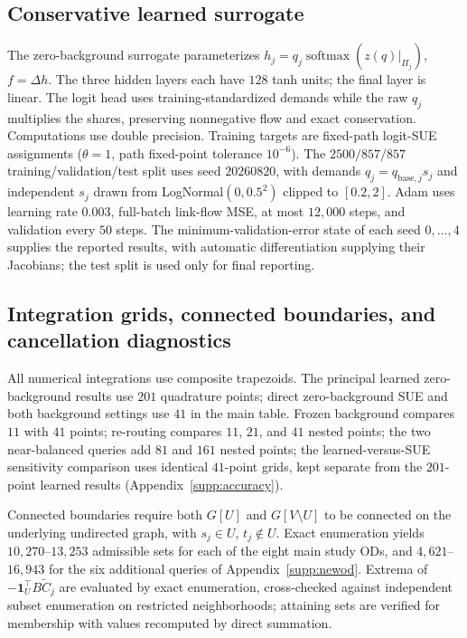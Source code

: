 \subsection{Conservative learned surrogate}\label{supp:protocol}
The zero-background surrogate parameterizes
$h_j=q_j\operatorname{softmax}(z(q)|_{\Pi_j})$, $f=\Delta h$.
The three hidden layers each have $128$ tanh units; the final layer is
linear. The logit head uses training-standardized demands while the raw
$q_j$ multiplies the shares, preserving nonnegative flow and exact
conservation. Computations use double precision.
Training targets are fixed-path logit-SUE assignments ($\theta=1$,
path fixed-point tolerance $10^{-6}$). The $2500/857/857$
training/validation/test split uses seed $20260820$, with demands
$q_j=q_{\mathrm{base},j}s_j$ and independent $s_j$ drawn from
LogNormal$(0,0.5^2)$ clipped to $[0.2,2]$.
Adam uses learning rate $0.003$, full-batch link-flow MSE, at most
$12{,}000$ steps, and validation every $50$ steps. The
minimum-validation-error state of each seed $0,\ldots,4$ supplies
the reported results, with automatic differentiation supplying their
Jacobians; the test split is used only for final reporting.

\subsection{Integration grids, connected boundaries, and cancellation diagnostics}\label{supp:quadrature}
All numerical integrations use composite trapezoids. The principal
learned zero-background results use $201$ quadrature points; direct
zero-background SUE and both background settings use $41$ in the main
table. Frozen background compares $11$ with $41$ points; re-routing
compares $11$, $21$, and $41$ nested points; the two near-balanced
queries add $81$ and $161$ nested points; the learned-versus-SUE
sensitivity comparison uses identical $41$-point grids, kept separate
from the $201$-point learned results (Appendix~\ref{supp:accuracy}).

Connected boundaries require both $G[U]$ and $G[V\setminus U]$ to be
connected on the underlying undirected graph, with $s_j\in U$, $t_j\notin U$.
Exact enumeration yields $10{,}270$--$13{,}253$ admissible sets for each
of the eight main study ODs, and $4{,}621$--$16{,}943$ for the six
additional queries of Appendix~\ref{supp:newod}.
Extrema of $-\mathbf1_U^\top B\widetilde C_j$ are evaluated by exact
enumeration, cross-checked against independent subset enumeration on
restricted neighborhoods; attaining sets are verified for membership
with values recomputed by direct summation.

